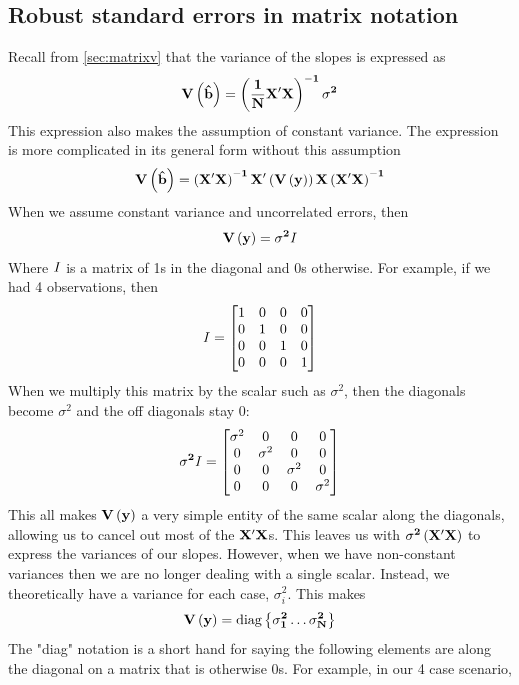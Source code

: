 \subsection{Robust standard errors in matrix notation}
\label{sec:robustmatrix}
Recall from \ref{sec:matrixv} that the variance of the slopes is expressed as
\[
\bf V\left({\hat{b}}\right)=\left(\frac{1}{N}X'X\right)^{-1}\sigma^2
\]
This expression also makes the assumption of constant variance. The expression is more complicated in its general form without this assumption
\begin{equation}
\bf V\left({\hat{b}}\right)=\left(X'X\right)^{-1}X'\left(V\left(y\right)\right)X\left(X'X\right)^{-1}
\end{equation}
When we assume constant variance and uncorrelated errors, then
\begin{equation}
\bf V\left(y\right)=\sigma^2 \it I
\end{equation}
Where $\bf \it I$ is a matrix of 1s in the diagonal and 0s otherwise. For example, if we had 4 observations, then
\[
\bf \it I =
\begin{bmatrix}
1&0&0&0 \\
0&1&0&0 \\
0&0&1&0 \\
0&0&0&1 \\
\end{bmatrix}
\]
When we multiply this matrix by the scalar such as $\sigma^2$, then the diagonals become $\sigma^2$ and the off diagonals stay 0:
\[
\bf \sigma^2\it I =
\begin{bmatrix}
\sigma^2&0&0&0 \\
0&\sigma^2&0&0 \\
0&0&\sigma^2&0 \\
0&0&0&\sigma^2 \\
\end{bmatrix}
\]
This all makes $\bf V\left(y\right)$ a very simple entity of the same scalar along the diagonals, allowing us to cancel out most of the $\bf X'X$s. This leaves us with $\bf \sigma^2\left(X'X\right)$ to express the variances of our slopes. However, when we have non-constant variances then we are no longer dealing with a single scalar. Instead, we theoretically have a variance for each case, $\sigma_i^2$. This makes
\begin{equation}
\bf V\left(y\right)=\mbox{diag}\left\{\sigma_1^2\ldots\sigma_N^2\right\}
\end{equation}
The "diag" notation is a short hand for saying the following elements are along the diagonal on a matrix that is otherwise 0s. For example, in our 4 case scenario,
